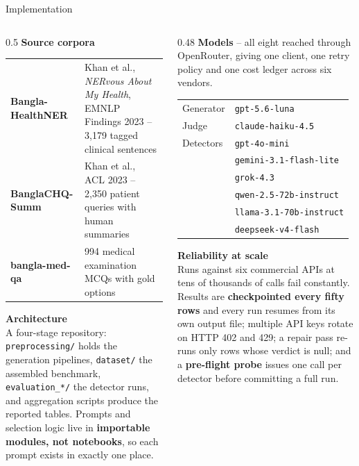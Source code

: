 \documentclass[aspectratio=169,11pt]{beamer}
\begin{document}
\begin{frame}[shrink=12]{Implementation}
\vspace{-1mm}
{\footnotesize
\begin{columns}[T]
\begin{column}{0.5\textwidth}
\textbf{Source corpora}\\[1mm]
\begin{tabular}{@{}p{22mm}p{32mm}@{}}
\textbf{Bangla-HealthNER} & Khan et al., \emph{NERvous About My Health}, EMNLP Findings 2023 -- 3,179 tagged clinical sentences\\[1.5mm]
\textbf{BanglaCHQ-Summ} & Khan et al., ACL 2023 -- 2,350 patient queries with human summaries\\[1.5mm]
\textbf{bangla-med-qa} & 994 medical examination MCQs with gold options\\
\end{tabular}
\vspace{2.5mm}
\textbf{Architecture}\\[1mm]
A four-stage repository: \texttt{preprocessing/} holds the generation pipelines, \texttt{dataset/} the assembled benchmark, \texttt{evaluation\_*/} the detector runs, and aggregation scripts produce the reported tables. Prompts and selection logic live in \textbf{importable modules, not notebooks}, so each prompt exists in exactly one place.
\end{column}
\begin{column}{0.48\textwidth}
\textbf{Models}\; -- all eight reached through OpenRouter, giving one client, one retry policy and one cost ledger across six vendors.\\[1mm]
\begin{tabular}{@{}ll@{}}
Generator & \texttt{gpt-5.6-luna}\\
Judge & \texttt{claude-haiku-4.5}\\
Detectors & \texttt{gpt-4o-mini}\\
 & \texttt{gemini-3.1-flash-lite}\\
 & \texttt{grok-4.3}\\
 & \texttt{qwen-2.5-72b-instruct}\\
 & \texttt{llama-3.1-70b-instruct}\\
 & \texttt{deepseek-v4-flash}\\
\end{tabular}
\vspace{2.5mm}
\textbf{Reliability at scale}\\[1mm]
Runs against six commercial APIs at tens of thousands of calls fail constantly. Results are \textbf{checkpointed every fifty rows} and every run resumes from its own output file; multiple API keys rotate on HTTP 402 and 429; a repair pass re-runs only rows whose verdict is null; and a \textbf{pre-flight probe} issues one call per detector before committing a full run.
\end{column}
\end{columns}
}
\end{frame}
\end{document}
